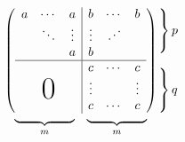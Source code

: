 \documentclass{article} %
\begin{document}
	\[
	\begin{array}{c@{\hspace{-5pt}}l}	%
		\left(
		\begin{array}{ccc|ccc}
			a & \cdots & a & b & \cdots & b \\
			&  \ddots & \vdots & \vdots & \iddots & \\
			& & a & b \\ \hline
			& &   & c & \cdots & c \\
			& &   & \vdots & & \vdots \\
			\multicolumn{3}{c|}{\raisebox{2ex}[0pt]{\Huge 0}} & c & \cdots & c
		\end{array}
		\right)
		&
		\begin{array}{l}
			\left.\rule{0mm}{7mm}\right\}p \\
			\\
			\left.\rule{0mm}{7mm}\right\}q
		\end{array}
	\\[-5pt]
	\begin{array}{cc}
		\underbrace{\rule{17mm}{0mm}}_m &
		\underbrace{\rule{17mm}{0mm}}_m
	\end{array}
	\end{array}
	\]
	
\end{document}
